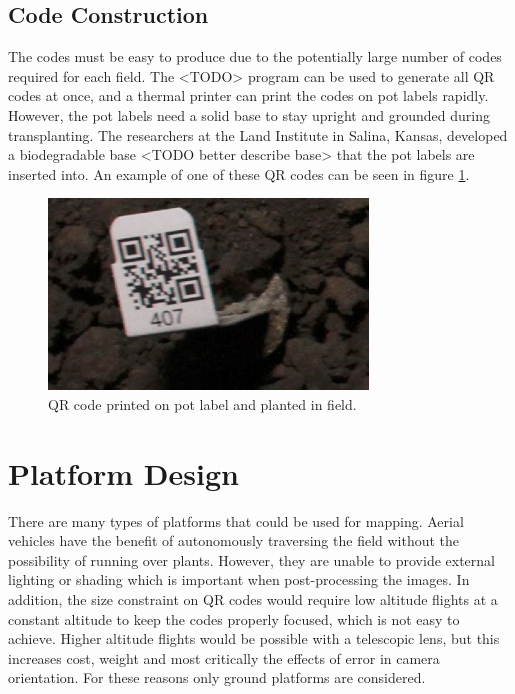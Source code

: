 \subsection{Code Construction}

The codes must be easy to produce due to the potentially large number of codes required for each field.  The <TODO> program can be used to generate all QR codes at once, and a thermal printer can print the codes on pot labels rapidly.  However, the pot labels need a solid base to stay upright and grounded during transplanting. The researchers at the Land Institute in Salina, Kansas, developed a biodegradable base <TODO better describe base> that the pot labels are inserted into.  An example of one of these QR codes can be seen in figure \ref{QR_code}.

\begin{figure}[htb]
	\centering
    \includegraphics[height=2in]{figures/qr_code_407.jpg}
    \caption[QR code]{QR code printed on pot label and planted in field.}
    \label{QR_code}
\end{figure}

\section{Platform Design}
\label{section:platform_design}

There are many types of platforms that could be used for mapping.  Aerial vehicles have the benefit of autonomously traversing the field without the possibility of running over plants. However, they are unable to provide external lighting or shading which is important when post-processing the images. In addition, the size constraint on QR codes would require low altitude flights at a constant altitude to keep the codes properly focused, which is not easy to achieve.  Higher altitude flights would be possible with a telescopic lens, but this increases cost, weight and most critically the effects of error in camera orientation.  For these reasons only ground platforms are considered.

